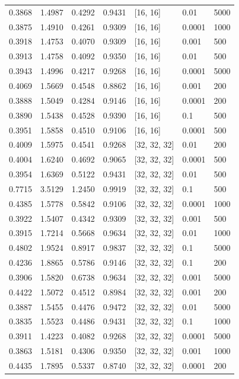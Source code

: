 \begin{tabular}{lllllll}
0.3868 & 1.4987 & 0.4292 & 0.9431 & [16, 16] & 0.01 & 5000 \\
0.3875 & 1.4910 & 0.4261 & 0.9309 & [16, 16] & 0.0001 & 1000 \\
0.3918 & 1.4753 & 0.4070 & 0.9309 & [16, 16] & 0.001 & 500 \\
0.3913 & 1.4758 & 0.4092 & 0.9350 & [16, 16] & 0.01 & 500 \\
0.3943 & 1.4996 & 0.4217 & 0.9268 & [16, 16] & 0.0001 & 5000 \\
0.4069 & 1.5669 & 0.4548 & 0.8862 & [16, 16] & 0.001 & 200 \\
0.3888 & 1.5049 & 0.4284 & 0.9146 & [16, 16] & 0.0001 & 200 \\
0.3890 & 1.5438 & 0.4528 & 0.9390 & [16, 16] & 0.1 & 500 \\
0.3951 & 1.5858 & 0.4510 & 0.9106 & [16, 16] & 0.0001 & 500 \\
0.4009 & 1.5975 & 0.4541 & 0.9268 & [32, 32, 32] & 0.01 & 200 \\
0.4004 & 1.6240 & 0.4692 & 0.9065 & [32, 32, 32] & 0.0001 & 500 \\
0.3954 & 1.6369 & 0.5122 & 0.9431 & [32, 32, 32] & 0.01 & 500 \\
0.7715 & 3.5129 & 1.2450 & 0.9919 & [32, 32, 32] & 0.1 & 500 \\
0.4385 & 1.5778 & 0.5842 & 0.9106 & [32, 32, 32] & 0.0001 & 1000 \\
0.3922 & 1.5407 & 0.4342 & 0.9309 & [32, 32, 32] & 0.001 & 500 \\
0.3915 & 1.7214 & 0.5668 & 0.9634 & [32, 32, 32] & 0.01 & 1000 \\
0.4802 & 1.9524 & 0.8917 & 0.9837 & [32, 32, 32] & 0.1 & 5000 \\
0.4236 & 1.8865 & 0.5786 & 0.9146 & [32, 32, 32] & 0.1 & 200 \\
0.3906 & 1.5820 & 0.6738 & 0.9634 & [32, 32, 32] & 0.001 & 5000 \\
0.4422 & 1.5072 & 0.4512 & 0.8984 & [32, 32, 32] & 0.001 & 200 \\
0.3887 & 1.5455 & 0.4476 & 0.9472 & [32, 32, 32] & 0.01 & 5000 \\
0.3835 & 1.5523 & 0.4486 & 0.9431 & [32, 32, 32] & 0.1 & 1000 \\
0.3911 & 1.4223 & 0.4082 & 0.9268 & [32, 32, 32] & 0.0001 & 5000 \\
0.3863 & 1.5181 & 0.4306 & 0.9350 & [32, 32, 32] & 0.001 & 1000 \\
0.4435 & 1.7895 & 0.5337 & 0.8740 & [32, 32, 32] & 0.0001 & 200 \\

\end{tabular}
